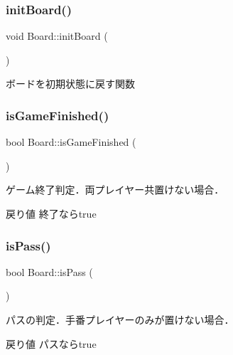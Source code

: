 \subsubsection{\texorpdfstring{init\+Board()}{initBoard()}}
{\footnotesize\ttfamily void Board\+::init\+Board (\begin{DoxyParamCaption}{ }\end{DoxyParamCaption})\hspace{0.3cm}{\ttfamily [inline]}}



ボードを初期状態に戻す関数 

\mbox{\label{class_board_a2572833882a68b3293fe15842b76c33f}} 
\subsubsection{\texorpdfstring{is\+Game\+Finished()}{isGameFinished()}}
{\footnotesize\ttfamily bool Board\+::is\+Game\+Finished (\begin{DoxyParamCaption}{ }\end{DoxyParamCaption})\hspace{0.3cm}{\ttfamily [inline]}}



ゲーム終了判定．両プレイヤー共置けない場合． 

\begin{DoxyReturn}{戻り値}
終了ならtrue 
\end{DoxyReturn}
\mbox{\label{class_board_a451dfe3ec3bdc5bac1a7e78637c9cb3d}} 
\subsubsection{\texorpdfstring{is\+Pass()}{isPass()}}
{\footnotesize\ttfamily bool Board\+::is\+Pass (\begin{DoxyParamCaption}{ }\end{DoxyParamCaption})\hspace{0.3cm}{\ttfamily [inline]}}



パスの判定．手番プレイヤーのみが置けない場合． 

\begin{DoxyReturn}{戻り値}
パスならtrue 
\end{DoxyReturn}
\mbox{\label{class_board_abd32a0744a94da0c111d067a062012c4}} 

